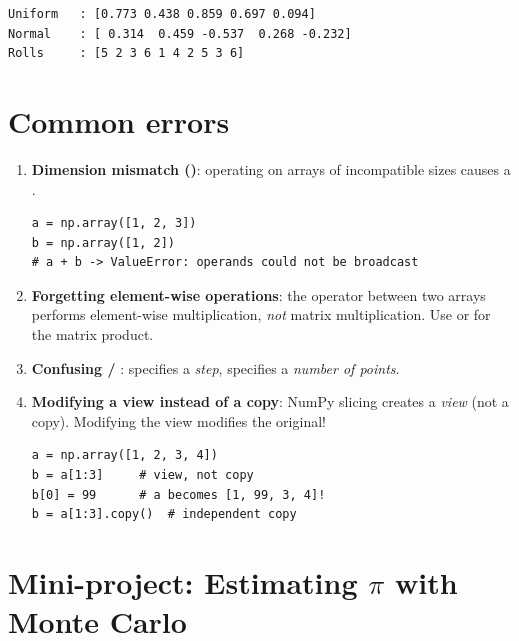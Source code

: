 \begin{codeoutput}
\begin{verbatim}
Uniform   : [0.773 0.438 0.859 0.697 0.094]
Normal    : [ 0.314  0.459 -0.537  0.268 -0.232]
Rolls     : [5 2 3 6 1 4 2 5 3 6]
\end{verbatim}
\end{codeoutput}

\section{Common errors}

\begin{errmark}
\begin{enumerate}
    \item \textbf{Dimension mismatch ()}: operating on
    arrays of incompatible sizes causes a .
    \begin{verbatim}
a = np.array([1, 2, 3])
b = np.array([1, 2])
# a + b -> ValueError: operands could not be broadcast
    \end{verbatim}

    \item \textbf{Forgetting element-wise operations}: the \py{*} operator
    between two arrays performs element-wise multiplication, \emph{not}
    matrix multiplication. Use  or  for the matrix product.

    \item \textbf{Confusing  / }:
     specifies a \emph{step},
     specifies a \emph{number of points}.

    \item \textbf{Modifying a view instead of a copy}: NumPy slicing creates a
    \emph{view} (not a copy). Modifying the view modifies the original!
    \begin{verbatim}
a = np.array([1, 2, 3, 4])
b = a[1:3]     # view, not copy
b[0] = 99      # a becomes [1, 99, 3, 4]!
b = a[1:3].copy()  # independent copy
    \end{verbatim}
\end{enumerate}
\end{errmark}

\section{Mini-project: Estimating $\pi$ with Monte Carlo}

